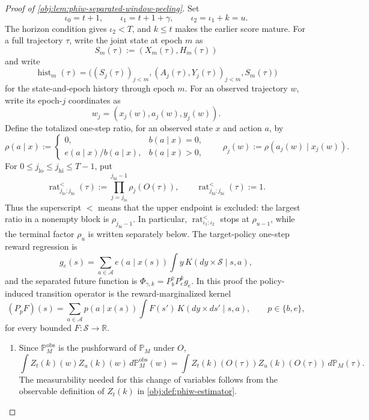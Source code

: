 \begin{proof}[Proof of \cref{obj:lem:phiw-separated-window-peeling}]
Set
\[
\iota_0=t+1,\qquad \iota_1=t+1+\gamma,\qquad \iota_2=\iota_1+k=u .
\]
The horizon condition gives \(\iota_2<T\), and \(k\le t\) makes the earlier score mature.  For a full trajectory \(\tau\), write the joint state at epoch \(m\) as
\[
S_m(\tau):=(X_m(\tau),H_m(\tau))
\]
and write
\[
\operatorname{hist}_m(\tau)
=
\bigl((S_j(\tau))_{j<m},(A_j(\tau),Y_j(\tau))_{j<m},S_m(\tau)\bigr)
\]
for the state-and-epoch history through epoch \(m\).  For an observed trajectory \(w\), write its epoch-\(j\) coordinates as
\[
w_j=(x_j(w),a_j(w),y_j(w)).
\]
Define the totalized one-step ratio, for an observed state \(x\) and action \(a\), by
\[
\rho(a\mid x)
:=
\begin{cases}
0, & b(a\mid x)=0,\\
e(a\mid x)/b(a\mid x), & b(a\mid x)>0,
\end{cases}
\qquad
\rho_j(w):=\rho(a_j(w)\mid x_j(w)).
\] For
\(0\le j_{\mathrm{lo}}\le j_{\mathrm{hi}}\le T-1\), put
\[
\operatorname{rat}^{<}_{j_{\mathrm{lo}}:j_{\mathrm{hi}}}(\tau)
:=
\prod_{j=j_{\mathrm{lo}}}^{j_{\mathrm{hi}}-1}\rho_j(O(\tau)),
\qquad
\operatorname{rat}^{<}_{j_{\mathrm{hi}}:j_{\mathrm{hi}}}(\tau):=1 .
\]
Thus the superscript \({<}\) means that the upper endpoint is excluded: the largest ratio in a
nonempty block is \(\rho_{j_{\mathrm{hi}}-1}\). In particular,
\(\operatorname{rat}^{<}_{\iota_1:\iota_2}\) stops at \(\rho_{u-1}\), while the terminal factor
\(\rho_u\) is written separately below. The target-policy one-step reward regression is
\[
g_e(s)=
\sum_{a\in\mathcal A}e(a\mid x(s))
\int y\,K(dy\times\mathcal S\mid s,a),
\]
and the separated future function is \(\Phi_{\gamma,k}=P_b^\gamma P_e^k g_e\).  In this proof the policy-induced transition operator is the reward-marginalized kernel
\[
(P_pF)(s)
=
\sum_{a\in\mathcal A}p(a\mid x(s))
\int F(s')\,K(dy\times ds'\mid s,a),
\qquad p\in\{b,e\},
\]
for every bounded \(F:\mathcal S\to\mathbb R\).

\begin{enumerate}
\item Since \(\mathbb P_M^{\mathrm{obs}}\) is the pushforward of \(\mathbb P_M\) under \(O\),
\[
\int Z_t(k)(w)Z_u(k)(w)\,d\mathbb P_M^{\mathrm{obs}}(w)
=
\int Z_t(k)(O(\tau))Z_u(k)(O(\tau))\,d\mathbb P_M(\tau).
\]
The measurability needed for this change of variables follows from the observable definition of \(Z_t(k)\) in \cref{obj:def:phiw-estimator}.


\end{enumerate}
\end{proof}
